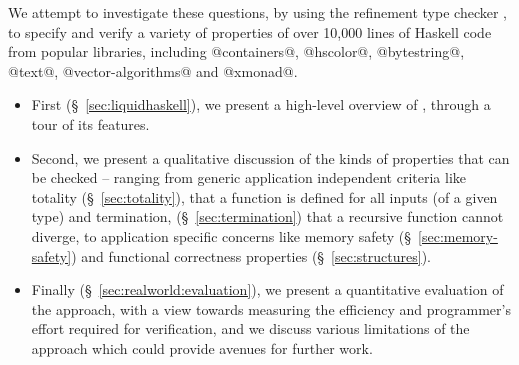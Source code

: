 We attempt to investigate these questions, by using the
refinement type checker \toolname, to specify and verify a variety of 
properties of over 10,000 lines of Haskell code from popular 
libraries, including @containers@, \hbox{@hscolor@,} @bytestring@, @text@, 
@vector-algorithms@ and @xmonad@. 
%
\begin{itemize}
\item First (\S~\ref{sec:liquidhaskell}), 
we present a high-level overview of \toolname, through a tour 
of its features.
%

\item Second, we present a qualitative discussion of the kinds of properties
that can be checked -- ranging from generic application independent 
criteria like totality (\S~\ref{sec:totality}), 
\ie that a function is defined for all inputs (of a given type)
and termination, 
(\S~\ref{sec:termination}) 
\ie that a recursive function cannot diverge,
to application specific concerns like memory safety (\S~\ref{sec:memory-safety}) 
and functional correctness properties (\S~\ref{sec:structures}).
%
\item Finally (\S~\ref{sec:realworld:evaluation}), we present a quantitative evaluation of the approach, with a view
towards measuring the efficiency and programmer's effort required for
verification, 
and we discuss various limitations of the approach which could
provide avenues for further work.
\end{itemize}
